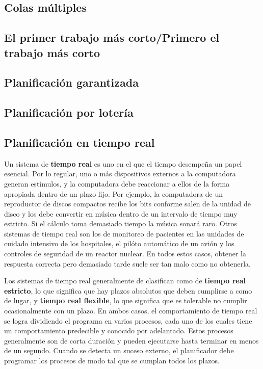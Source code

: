 \documentclass{article}
\begin{document}
\subsection{Colas m\'ultiples}
\subsection{El primer trabajo m\'as corto/Primero el trabajo m\'as corto}
\subsection{Planif\/icaci\'on garantizada}
\subsection{Planif\/icaci\'on por loter\'ia}
\subsection{Planif\/icaci\'on en tiempo real}
Un sistema de {\bf tiempo real} es uno en el que el tiempo desempe\~na 
un papel esencial. Por lo regular, uno o m\'as dispositivos externos a la 
computadora generan est\'imulos, y la computadora debe reaccionar a ellos 
de la forma apropiada dentro de un plazo f\/ijo. Por ejemplo, la computadora 
de un reproductor de discos compactos recibe los bits conforme salen de 
la unidad de disco y los debe convertir en m\'usica dentro de un intervalo 
de tiempo muy estricto. Si el c\'alculo toma demasiado tiempo la m\'usica 
sonar\'a raro. Otros sistemas de tiempo real son los de monitoreo de 
pacientes en las unidades de cuidado intensivo de los hospitales, el 
pil\'oto autom\'atico de un avi\'on y los controles de seguridad de un 
reactor nuclear. En todos estos casos, obtener la respuesta correcta 
pero demasiado tarde suele ser tan malo como no obtenerla.

Los sistemas de tiempo real generalmente de clasif\/ican como de {\bf tiempo 
real estricto}, lo que signif\/ica que hay plazos absolutos que deben cumplirse 
a como de lugar, y {\bf tiempo real flexible}, lo que signif\/ica que es tolerable 
no cumplir ocasionalmente con un plazo. En ambos casos, el comportamiento de 
tiempo real se logra dividiendo el programa en varios procesos, cada uno de 
los cuales tiene un comportamiento predecible y conocido por adelantado. 
Estos procesos generalmente son de corta duraci\'on y pueden ejecutarse hasta 
terminar en menos de un segundo. Cuando se detecta un suceso externo, el 
planif\/icador debe programar los procesos de modo tal que se cumplan todos los 
plazos. 
\end{document}
